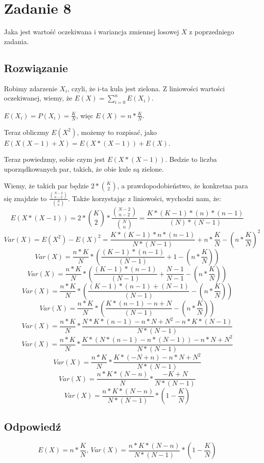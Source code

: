 \section{Zadanie 8}
Jaka jest wartość oczekiwana i wariancja zmiennej losowej \(X\) z poprzedniego zadania.

\subsection*{Rozwiązanie}
Robimy zdarzenie \(X_i\), czyli, że i-ta kula jest zielona. Z liniowości wartości oczekiwanej, wiemy, że \(E(X) = \sum_{i = 0}^{n} E(X_i)\).

\(E(X_i) = P(X_i) = \frac{K}{N}\), więc \(E(X) = n * \frac{K}{N}\).

Teraz obliczmy \(E(X^2)\), możemy to rozpisać, jako \(E(X (X-1) + X) = E(X*(X-1)) + E(X)\).

Teraz powiedzmy, sobie czym jest \(E(X*(X-1))\). Bedzie to liczba uporządkowanych par, takich, że obie kule są zielone.

Wiemy, że takich par będzie \(2 * \binom{K}{2}\), a prawdopodobieństwo, że konkretna para się znajdzie to \(\frac{\binom{N-2}{n-2}}{\binom{N}{n}}\). Także korzystając z liniowości, wychodzi nam, że:
\[
	E(X*(X-1)) = 2 * \binom{K}{2} * \frac{\binom{N-2}{n-2}}{\binom{N}{n}} = \frac{K*(K-1) * (n) * (n-1)}{(N)*(N-1)}
\]
\[
	Var(X) = E(X^2)-E(X)^2 = \frac{K*(K-1) * n * (n-1)}{N*(N-1)} + n * \frac{K}{N} - (n*\frac{K}{N})^2
\]
\[
	Var(X) = \frac{n*K}{N} * (\frac{(K-1) * (n-1)}{(N-1)} + 1 - (n*\frac{K}{N}))
\]
\[
	Var(X) = \frac{n*K}{N} * (\frac{(K-1) * (n-1)}{(N-1)} + \frac{N-1}{N-1} - (n*\frac{K}{N}))
\]
\[
	Var(X) = \frac{n*K}{N} * (\frac{(K-1) * (n-1) + (N-1)}{(N-1)} - (n*\frac{K}{N}))
\]
\[
	Var(X) = \frac{n*K}{N} * (\frac{K * (n-1) - n + N}{(N-1)} - (n*\frac{K}{N}))
\]
\[
	Var(X) = \frac{n*K}{N} * \frac{N*K*(n-1) - n*N + N^2 - n * K * (N-1)}{N * (N-1)}
\]
\[
	Var(X) = \frac{n*K}{N} * \frac{K * (N * (n-1) - n * (N-1)) - n*N + N^2}{N * (N-1)}
\]
\[
	Var(X) = \frac{n*K}{N} * \frac{K * ( - N + n ) - n*N + N^2}{N * (N-1)}
\]
\[
	Var(X) = \frac{n*K*(N-n)}{N} * \frac{-K + N}{N * (N-1)}
\]
\[
	Var(X) = \frac{n*K*(N-n)}{N*(N-1)} * (1 - \frac{K}{N})
\]
\subsection*{Odpowiedź}
\[
	\boxed{\text{\(E(X) = n * \frac{K}{N}\), \(Var(X) = \frac{n*K*(N-n)}{N*(N-1)} * (1 - \frac{K}{N})\)}}
\]
